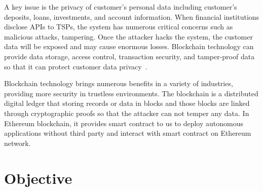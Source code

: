 A key issue is the privacy of customer's personal data including customer's deposits, loans, investments, and account information. When financial institutions disclose APIs to TSPs, the system has numerous critical concerns such as malicious attacks, tampering. Once the attacker hacks the system, the customer data will be exposed and may cause enormous losses. Blockchain technology can provide data storage, access control, transaction security, and tamper-proof data so that it can protect customer data privacy~\cite{wang2020blockchain}.\par
Blockchain technology brings numerous benefits in a variety of industries, providing more security in trustless environments. The blockchain is a distributed digital ledger that storing records or data in blocks and those blocks are linked through cryptographic proofs so that the attacker can not temper any data. In Ethereum blockchain, it provides smart contract to us to deploy autonomous applications without third party and interact with smart contract on Ethereum network.\par

\section{Objective}

